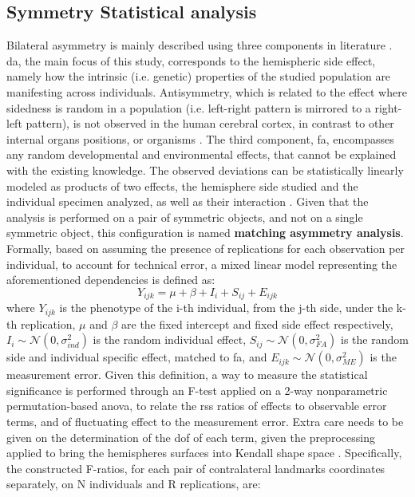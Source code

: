\subsection{Symmetry Statistical analysis}
\label{subsec:stat_methods}
Bilateral asymmetry is mainly described using three components in literature \cite{klingenberg2002}\cite{Vingerhoets2021}. \Acf{da}, the main focus of this study, corresponds to the hemispheric side effect, namely how the intrinsic (i.e. genetic) properties of the studied population are manifesting across individuals. Antisymmetry, which is related to the effect where sidedness is random in a population (i.e. left-right pattern is mirrored to a right-left pattern), is not observed in the human cerebral cortex, in contrast to other internal organs positions, or organisms \cite{Neubauer2020}. The third component, \acf{fa}, encompasses any random developmental and environmental effects, that cannot be explained with the existing knowledge. The observed deviations can be statistically linearly modeled as products of two effects, the hemisphere side studied and the individual specimen analyzed, as well as their interaction \cite{klingenberg2002}. Given that the analysis is performed on a pair of symmetric objects, and not on a single symmetric object, this configuration is named \textbf{matching asymmetry analysis}. Formally, based on \cite{VanDongen1999} assuming the presence of replications for each observation per individual, to account for technical error, a mixed linear model representing the aforementioned dependencies is defined as:
\begin{equation}
Y_{ijk} = \mu + \beta + I_i + S_{ij} + E_{ijk}
\end{equation}
where $Y_{ijk}$ is the phenotype of the i-th individual, from the j-th side, under the k-th replication, $\mu$ and $\beta$ are the fixed intercept and fixed side effect respectively, $I_i\sim\mathcal{N}(0,\sigma^2_{ind})$ is the random individual effect,  $S_{ij}\sim\mathcal{N}(0,\sigma^2_{FA})$ is the random side and individual specific effect, matched to \ac{fa}, and $E_{ijk}\sim\mathcal{N}(0,\sigma^2_{ME})$ is the measurement error. Given this definition, a way to measure the statistical significance is performed through an F-test applied on a 2-way nonparametric permutation-based \ac{anova}, to relate the \ac{rss} ratios of effects to observable error terms, and of fluctuating effect to the measurement error. Extra care needs to be given on the determination of the \ac{dof} of each term, given the preprocessing applied to bring the hemispheres surfaces into Kendall shape space \cite{klingenberg2002}.  Specifically, the constructed F-ratios, for each pair of contralateral landmarks coordinates separately, on N individuals and R replications, are:

